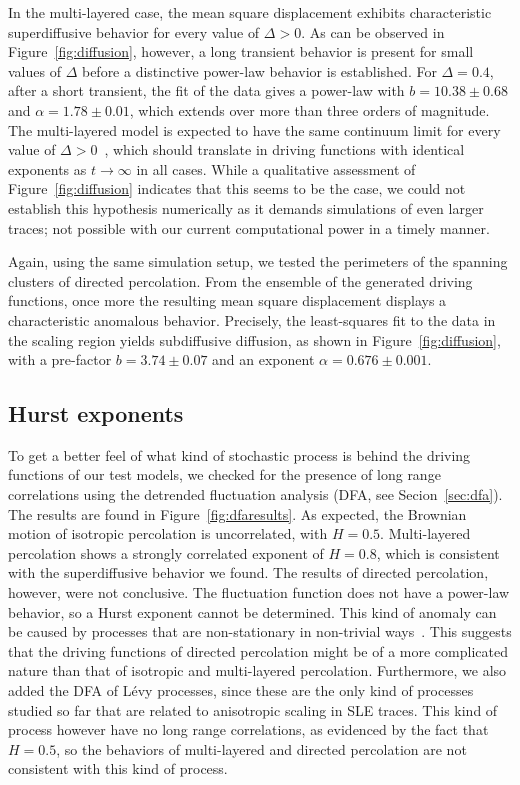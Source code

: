 In the multi-layered case, the mean square displacement exhibits characteristic
superdiffusive behavior for every value of $\Delta>0$. As can be observed in
Figure~\ref{fig:diffusion}, however, a long transient behavior is present for
small values of $\Delta$ before a distinctive power-law behavior is
established. For $\Delta=0.4$, after a short transient, the fit of the data
gives a power-law with $b=10.38\pm0.68$ and $\alpha=1.78\pm0.01$, which extends
over more than three orders of magnitude. The multi-layered model is expected
to have the same continuum limit for every value of
$\Delta>0$~\cite{Dayan1991}, which should translate in driving functions with
identical exponents as $t\rightarrow\infty$ in all cases. While a qualitative
assessment of Figure~\ref{fig:diffusion} indicates that this seems to be the
case, we could not establish this hypothesis numerically as it demands
simulations of even larger traces; not possible with our current computational
power in a timely manner. 

Again, using the same simulation setup, we tested the perimeters of the spanning
clusters of directed percolation. From the ensemble of the generated driving
functions, once more the resulting mean square displacement displays a
characteristic anomalous behavior. Precisely, the least-squares fit to the data
in the scaling region yields subdiffusive diffusion, as shown in
Figure~\ref{fig:diffusion}, with a pre-factor $b=3.74\pm0.07$ and an exponent
$\alpha=0.676\pm0.001$.

\subsection{Hurst exponents}
\label{sec:hurst}

To get a better feel of what kind of stochastic process is behind the driving
functions of our test models, we checked for the presence of long range
correlations using the detrended fluctuation analysis (DFA, see
Secion~\ref{sec:dfa}). The results are found in Figure~\ref{fig:dfaresults}. As
expected, the Brownian motion of isotropic percolation is uncorrelated, with
$H=0.5$. Multi-layered percolation shows a strongly correlated exponent of
$H=0.8$, which is consistent with the superdiffusive behavior we found. The
results of directed percolation, however, were not conclusive. The fluctuation
function does not have a power-law behavior, so a Hurst exponent cannot be
determined. This kind of anomaly can be caused by processes that are
non-stationary in non-trivial ways~\cite{Hu2001, Chen2002}. This suggests that
the driving functions of directed percolation might be of a more complicated
nature than that of isotropic and multi-layered percolation. Furthermore, we
also added the DFA of Lévy processes, since these are the only kind of
processes studied so far that are related to anisotropic scaling in SLE traces.
This kind of process however have no long range correlations, as evidenced by
the fact that $H=0.5$, so the behaviors of multi-layered and directed
percolation are not consistent with this kind of process.

